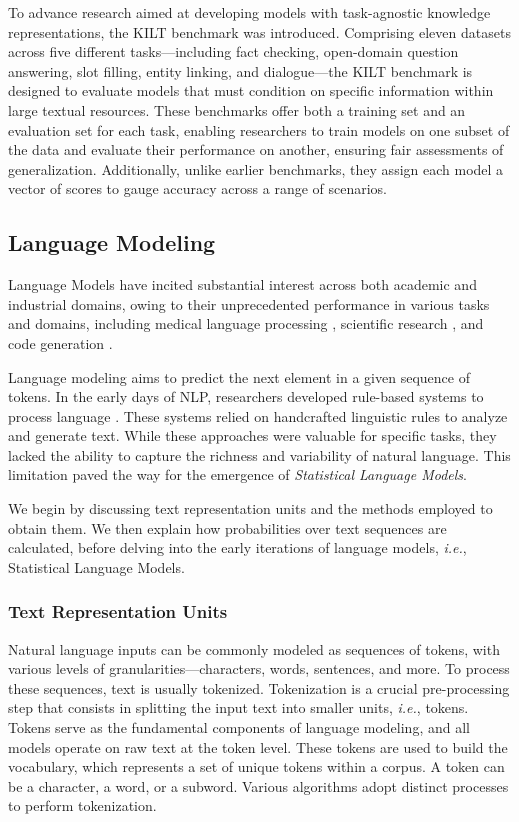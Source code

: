 To advance research aimed at developing models with task-agnostic knowledge representations, the KILT benchmark \citep{petroni-etal-2021-kilt} was introduced. Comprising eleven datasets across five different tasks—including fact checking, open-domain question answering, slot filling, entity linking, and dialogue—the KILT benchmark is designed to evaluate models that must condition on specific information within large textual resources.
These benchmarks offer both a training set and an evaluation set for each task, enabling researchers to train models on one subset of the data and evaluate their performance on another, ensuring fair assessments of generalization. Additionally, unlike earlier benchmarks, they assign each model a vector of scores to gauge accuracy across a range of scenarios.


\subsection{Language Modeling}

Language Models have incited substantial interest across both academic and industrial domains, owing to their unprecedented performance in various tasks and domains, including medical language processing \citep{thirunavukarasu2023large}, scientific research \citep{wang2023scientific}, and code generation \citep{xu2022systematic}.

Language modeling aims to predict the next element in a given sequence of tokens. In the early days of \ac{NLP}, researchers developed rule-based systems to process language \citep{manning1999foundations}. These systems relied on handcrafted linguistic rules to analyze and generate text. While these approaches were valuable for specific tasks, they lacked the ability to capture the richness and variability of natural language. This limitation paved the way for the emergence of \textit{Statistical Language Models}. 

We begin by discussing text representation units and the methods employed to obtain them. We then explain how probabilities over text sequences are calculated, before delving into the early iterations of language models, \textit{i.e.}, Statistical Language Models.

\subsubsection{Text Representation Units}

Natural language inputs can be commonly modeled as sequences of tokens, with various levels of granularities—characters, words, sentences, and more. To process these sequences, text is usually tokenized. Tokenization is a crucial pre-processing step that consists in splitting the input text into smaller units, \textit{i.e.}, tokens. Tokens serve as the fundamental components of language modeling, and all models operate on raw text at the token level. These tokens are used to build the vocabulary, which represents a set of unique tokens within a corpus. A token can be a character, a word, or a subword. Various algorithms adopt distinct processes to perform tokenization. 

